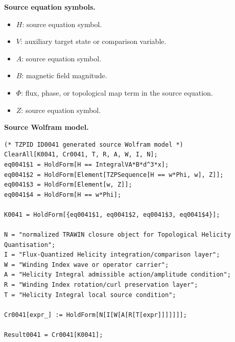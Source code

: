 \begin{minipage}[t]{0.49\linewidth}
\begingroup
\small
\raggedright
\textbf{Source equation symbols.}\par
\begin{itemize}[leftmargin=1.35em,itemsep=1pt,topsep=1pt,parsep=0pt]
    \item $H$: source equation symbol.
    \item $V$: auxiliary target state or comparison variable.
    \item $A$: source equation symbol.
    \item $B$: magnetic field magnitude.
    \item $\Phi$: flux, phase, or topological map term in the source equation.
    \item $Z$: source equation symbol.
\end{itemize}
\endgroup
\end{minipage}\hfill
\begin{minipage}[t]{0.47\linewidth}
\begingroup
\scriptsize
\raggedright
\textbf{Source Wolfram model.}\par
\begin{Verbatim}[fontsize=\tiny,breaklines=true,breakanywhere=true]
(* TZPID ID0041 generated source Wolfram model *)
ClearAll[K0041, Cr0041, T, R, A, W, I, N];
eq0041$1 = HoldForm[H == IntegralVA*B*d^3*x];
eq0041$2 = HoldForm[Element[TZPSequence[H == w*Phi, w], Z]];
eq0041$3 = HoldForm[Element[w, Z]];
eq0041$4 = HoldForm[H == w*Phi];

K0041 = HoldForm[{eq0041$1, eq0041$2, eq0041$3, eq0041$4}];

N = "normalized TRAWIN closure object for Topological Helicity Quantisation";
I = "Flux-Quantized Helicity integration/comparison layer";
W = "Winding Index wave or operator carrier";
A = "Helicity Integral admissible action/amplitude condition";
R = "Winding Index rotation/curl preservation layer";
T = "Helicity Integral local source condition";

Cr0041[expr_] := HoldForm[N[I[W[A[R[T[expr]]]]]]];

Result0041 = Cr0041[K0041];
\end{Verbatim}
\endgroup
\end{minipage}

